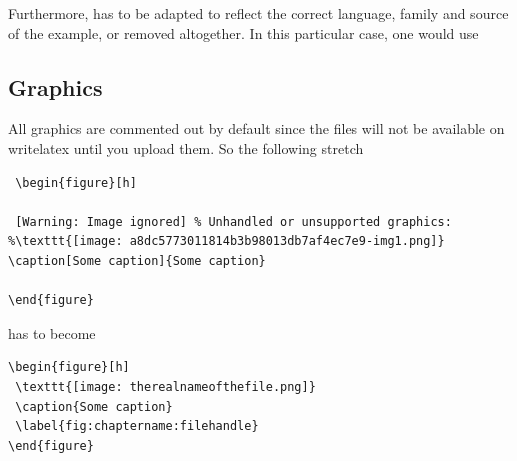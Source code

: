 Furthermore,  has to be adapted to reflect the correct language, family and source of the example, or removed altogether. In this particular case, one would use  

\subsection{Graphics}
All graphics are commented out by default since the files will not be available on writelatex until you upload them. So the following stretch

\begin{verbatim}
 \begin{figure}[h]

 [Warning: Image ignored] % Unhandled or unsupported graphics:
%\texttt{[image: a8dc5773011814b3b98013db7af4ec7e9-img1.png]}
\caption[Some caption]{Some caption}

\end{figure}
\end{verbatim}

has to become


\begin{verbatim}
\begin{figure}[h]
 \texttt{[image: therealnameofthefile.png]}
 \caption{Some caption}
 \label{fig:chaptername:filehandle}
\end{figure}
\end{verbatim}
